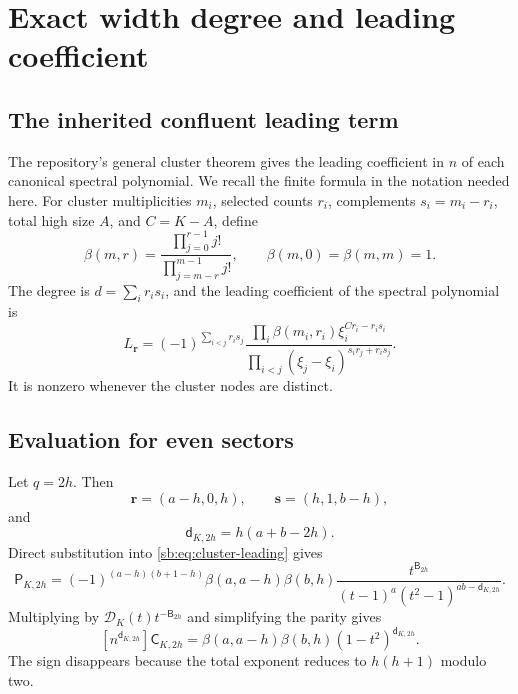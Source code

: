 \documentclass[11pt]{article}
\theoremstyle{definition}
\theoremstyle{remark}
\newcommand{\Den}{\mathcal D}
\newcommand{\Cblock}{\mathsf C}
\newcommand{\Pblock}{\mathsf P}
\newcommand{\Btri}{\mathsf B}
\newcommand{\dq}{\mathsf d}
\theoremstyle{definition}
\theoremstyle{plain}
\numberwithin{equation}{section}
\begin{document}
\section{Exact width degree and leading coefficient}
\label{sb:sec:leading}

\subsection{The inherited confluent leading term}
The repository's general cluster theorem gives the leading coefficient in
$n$ of each canonical spectral polynomial.  We recall the finite formula in
the notation needed here.  For cluster multiplicities $m_i$, selected counts
$r_i$, complements $s_i=m_i-r_i$, total high size $A$, and $C=K-A$, define
\begin{equation}
 \beta(m,r)=
 \frac{\displaystyle\prod_{j=0}^{r-1}j!}
 {\displaystyle\prod_{j=m-r}^{m-1}j!},
 \qquad \beta(m,0)=\beta(m,m)=1.
 \label{sb:eq:beta}
\end{equation}
The degree is $d=\sum_i r_is_i$, and the leading coefficient of the spectral
polynomial is
\begin{equation}
 L_{\boldsymbol r}=(-1)^{\sum_{i<j}r_is_j}
 \frac{\displaystyle\prod_i
 \beta(m_i,r_i)\xi_i^{Cr_i-r_is_i}}
 {\displaystyle\prod_{i<j}
 (\xi_j-\xi_i)^{s_ir_j+r_is_j}}.
 \label{sb:eq:cluster-leading}
\end{equation}
It is nonzero whenever the cluster nodes are distinct.

\noindent[Added 30 September 2026, batch~70: ``the repository's general
cluster theorem'' is Part~II's Theorem~\ref{rs:thm:cluster}. Formula
\eqref{sb:eq:cluster-leading} is \eqref{rs:eq:LC} symbol for symbol, with
$\beta(m,r)$ for Part~II's $B(m,r)$ \eqref{rs:eq:Bfactor}; the degree
$d=\sum_ir_is_i$ is Part~II's $d_{\boldsymbol r}$ \eqref{rs:eq:lambdad}.]

\subsection{Evaluation for even sectors}
Let $q=2h$.  Then
\begin{equation}
 \boldsymbol r=(a-h,0,h),
 \qquad
 \boldsymbol s=(h,1,b-h),
 \label{sb:eq:even-allocation}
\end{equation}
and
\begin{equation}
 \dq_{K,2h}=h(a+b-2h).
 \label{sb:eq:even-d}
\end{equation}
Direct substitution into \eqref{sb:eq:cluster-leading} gives
\begin{equation}
 [n^{\dq_{K,2h}}]\Pblock_{K,2h}
 =(-1)^{(a-h)(b+1-h)}
 \beta(a,a-h)\beta(b,h)
 \frac{t^{\Btri_{2h}}}
 {(t-1)^a(t^2-1)^{ab-\dq_{K,2h}}}.
 \label{sb:eq:P-leading-even}
\end{equation}
Multiplying by $\Den_K(t)t^{-\Btri_{2h}}$ and simplifying the parity gives
\begin{equation}
 \boxed{\displaystyle
 [n^{\dq_{K,2h}}]\Cblock_{K,2h}
 =\beta(a,a-h)\beta(b,h)
 (1-t^2)^{\dq_{K,2h}}.}
 \label{sb:eq:C-leading-even}
\end{equation}
The sign disappears because the total exponent reduces to $h(h+1)$ modulo
two.
\end{document}

